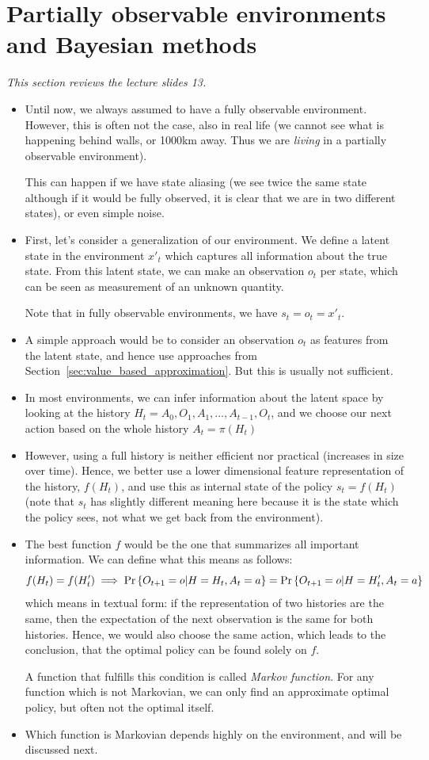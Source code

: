 \section{Partially observable environments and Bayesian methods}
\label{sec:partially_observable}
\textit{This section reviews the lecture slides 13.}
\begin{itemize}
	\item Until now, we always assumed to have a fully observable environment. However, this is often not the case, also in real life (we cannot see what is happening behind walls, or 1000km away. Thus we are \textit{living} in a partially observable environment).
	
	This can happen if we have state aliasing (we see twice the same state although if it would be fully observed, it is clear that we are in two different states), or even simple noise.
	\item First, let's consider a generalization of our environment. We define a latent state in the environment $x'_t$ which captures all information about the true state. From this latent state, we can make an observation $o_t$ per state, which can be seen as measurement of an unknown quantity.
	
	Note that in fully observable environments, we have $s_t=o_t=x'_t$.
	\item A simple approach would be to consider an observation $o_t$ as features from the latent state, and hence use approaches from Section~\ref{sec:value_based_approximation}. But this is usually not sufficient.
	\item In most environments, we can infer information about the latent space by looking at the history $H_t=A_0,O_1,A_1,...,A_{t-1},O_t$, and we choose our next action based on the whole history $A_t=\pi(H_t)$
	\item However, using a full history is neither efficient nor practical (increases in size over time). Hence, we better use a lower dimensional feature representation of the history, $f(H_t)$, and use this as internal state of the policy $s_t = f(H_t)$ (note that $s_t$ has slightly different meaning here because it is the state which the policy sees, not what we get back from the environment).
	\item The best function $f$ would be the one that summarizes all important information. We can define what this means as follows:
	$$f(H_t)=f(H'_t)\implies \Pr\left\{O_{t+1}=o|H=H_t,A_t=a\right\}=\Pr\left\{O_{t+1}=o|H=H'_t,A_t=a\right\}$$
	which means in textual form: if the representation of two histories are the same, then the expectation of the next observation is the same for both histories. Hence, we would also choose the same action, which leads to the conclusion, that the optimal policy can be found solely on $f$.
	
	A function that fulfills this condition is called \textit{Markov function}. For any function which is not Markovian, we can only find an approximate optimal policy, but often not the optimal itself.
	\item Which function is Markovian depends highly on the environment, and will be discussed next.
\end{itemize}
